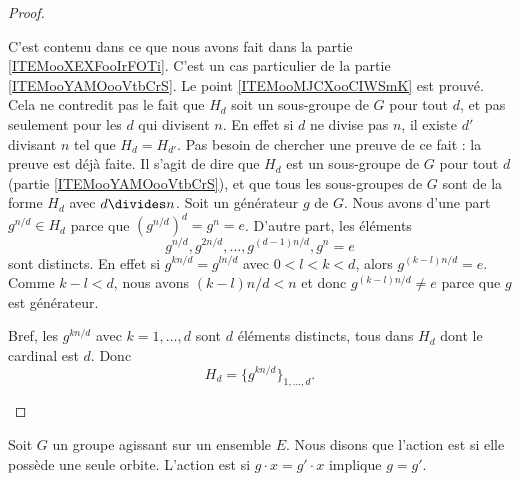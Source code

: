 \begin{proof}
\begin{subproof}
		\spitem[\( \Card(H_d)=d\)]
		C'est contenu dans ce que nous avons fait dans la partie \ref{ITEMooXEXFooIrFOTi}.
		C'est un cas particulier de la partie \ref{ITEMooYAMOooVtbCrS}.
		\spitem[Note]
		Le point \ref{ITEMooMJCXooCIWSmK} est prouvé. Cela ne contredit pas le fait que \( H_d\) soit un sous-groupe de \( G\) pour tout \( d\), et pas seulement pour les \( d\) qui divisent \( n\). En effet si \( d\) ne divise pas \( n\), il existe \( d'\) divisant \( n\) tel que \( H_d=H_{d'}\). Pas besoin de chercher une preuve de ce fait : la preuve est déjà faite. Il s'agit de dire que \( H_d\) est un sous-groupe de \( G\) pour tout \( d\) (partie \ref{ITEMooYAMOooVtbCrS}), et que tous les sous-groupes de \( G\) sont de la forme \( H_d\) avec \( d\divides n\).
		Soit un générateur \( g\) de \( G\). Nous avons d'une part \( g^{n/d}\in H_d\) parce que \( (g^{n/d})^d=g^n=e\). D'autre part, les éléments
		\begin{equation}
			g^{n/d}, g^{2n/d},\ldots, g^{(d-1)n/d}, g^{n}=e
		\end{equation}
		sont distincts. En effet si \( g^{kn/d}=g^{ln/d}\) avec \( 0<l<k<d\), alors \( g^{(k-l)n/d}=e\). Comme \( k-l<d\),  nous avons \( (k-l)n/d<n\) et donc \( g^{(k-l)n/d}\neq e\) parce que \( g\) est générateur.

		Bref, les \( g^{kn/d}\) avec \( k=1,\ldots, d\) sont \( d\) éléments distincts, tous dans \( H_d\) dont le cardinal est \( d\). Donc
		\begin{equation}
			H_d=\{ g^{kn/d} \}_{1,\ldots, d}.
		\end{equation}
	\end{subproof}
\end{proof}


\begin{definition}      \label{DEFooQDHPooCfDEuL}
	Soit \( G\) un groupe agissant sur un ensemble \( E\). Nous disons que l'action est  si elle possède une seule orbite. L'action est  si \( g\cdot x=g'\cdot x\) implique \( g=g'\).
\end{definition}
